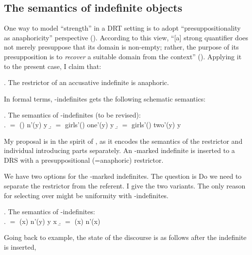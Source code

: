 \documentclass[11pt,a4paper]{article}
\begin{document}
\subsection{The semantics of indefinite objects}

One way to model ``strength'' in a DRT setting is to adopt
``presuppositionality as anaphoricity'' perspective
().  According to this view, ``[a] strong
quantifier does not merely presuppose that its domain is non-empty;
rather, the purpose of its presupposition is to \emph{recover} a
suitable domain from the context'' (). Applying it
to the present case, I claim that:

\ex. The restrictor of an accusative indefinite is anaphoric.


In formal terms, \acc-indefinites gets the following schematic
semantics:

\ex.\label{exsema1}
The semantics of \acc-indefinites (to be revised):\\
\a.\interp{[$n$ N-Acc]} $=$ 
{() \quad n'(y) \quad y \subseteq {} }
\b.
 $=$ 
{girls'() \quad one'(y) \quad y \subseteq {} }
\b.
 $=$ 
{girls'() \quad two'(y) \quad y \subseteq {} }

My proposal is in the spirit of , as it encodes the
semantics of the restrictor and individual introducing parts
separately. An \acc-marked indefinite is inserted to a DRS
with a presuppositional (=anaphoric) restrictor. 

We have two options for the \zero-marked indefinites. The question is
Do we need to separate the restrictor from the referent. I give the
two variants. The only reason for selecting  over
 might be uniformity with \acc-indefinites.

\ex.\label{exsemz1}
The semantics of \zero-indefinites:\\
\a.\label{exsemz11}
\interp{[$n$ N]} $=$ 
{(x) \quad n'(y) \quad y \subseteq x }
\b.\label{exsemz12}
\interp{[$n$ N]} $=$ 
{(x) \quad n'(x)}


Going back to  example, the state of the discourse is as
follows after the indefinite is inserted,
\end{document}
